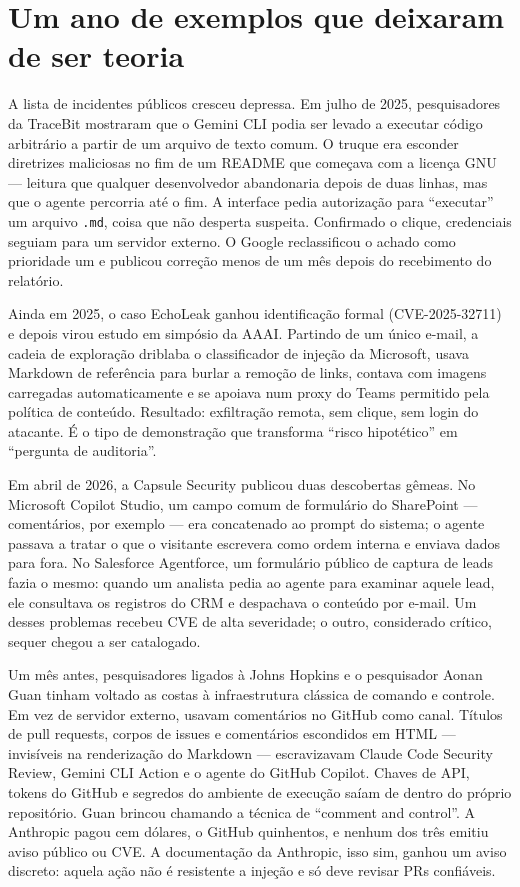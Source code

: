 \documentclass[12pt,a4paper]{article}
\begin{document}
\section{Um ano de exemplos que deixaram de ser teoria}

A lista de incidentes públicos cresceu depressa. Em julho de 2025, pesquisadores da TraceBit mostraram que o Gemini CLI podia ser levado a executar código arbitrário a partir de um arquivo de texto comum. O truque era esconder diretrizes maliciosas no fim de um README que começava com a licença GNU --- leitura que qualquer desenvolvedor abandonaria depois de duas linhas, mas que o agente percorria até o fim. A interface pedia autorização para ``executar'' um arquivo \texttt{.md}, coisa que não desperta suspeita. Confirmado o clique, credenciais seguiam para um servidor externo. O Google reclassificou o achado como prioridade um e publicou correção menos de um mês depois do recebimento do relatório.

Ainda em 2025, o caso EchoLeak ganhou identificação formal (CVE-2025-32711) e depois virou estudo em simpósio da AAAI. Partindo de um único e-mail, a cadeia de exploração driblaba o classificador de injeção da Microsoft, usava Markdown de referência para burlar a remoção de links, contava com imagens carregadas automaticamente e se apoiava num proxy do Teams permitido pela política de conteúdo. Resultado: exfiltração remota, sem clique, sem login do atacante. É o tipo de demonstração que transforma ``risco hipotético'' em ``pergunta de auditoria''.

Em abril de 2026, a Capsule Security publicou duas descobertas gêmeas. No Microsoft Copilot Studio, um campo comum de formulário do SharePoint --- comentários, por exemplo --- era concatenado ao prompt do sistema; o agente passava a tratar o que o visitante escrevera como ordem interna e enviava dados para fora. No Salesforce Agentforce, um formulário público de captura de leads fazia o mesmo: quando um analista pedia ao agente para examinar aquele lead, ele consultava os registros do CRM e despachava o conteúdo por e-mail. Um desses problemas recebeu CVE de alta severidade; o outro, considerado crítico, sequer chegou a ser catalogado.

Um mês antes, pesquisadores ligados à Johns Hopkins e o pesquisador Aonan Guan tinham voltado as costas à infraestrutura clássica de comando e controle. Em vez de servidor externo, usavam comentários no GitHub como canal. Títulos de pull requests, corpos de issues e comentários escondidos em HTML --- invisíveis na renderização do Markdown --- escravizavam Claude Code Security Review, Gemini CLI Action e o agente do GitHub Copilot. Chaves de API, tokens do GitHub e segredos do ambiente de execução saíam de dentro do próprio repositório. Guan brincou chamando a técnica de ``comment and control''. A Anthropic pagou cem dólares, o GitHub quinhentos, e nenhum dos três emitiu aviso público ou CVE. A documentação da Anthropic, isso sim, ganhou um aviso discreto: aquela ação não é resistente a injeção e só deve revisar PRs confiáveis.
\end{document}
